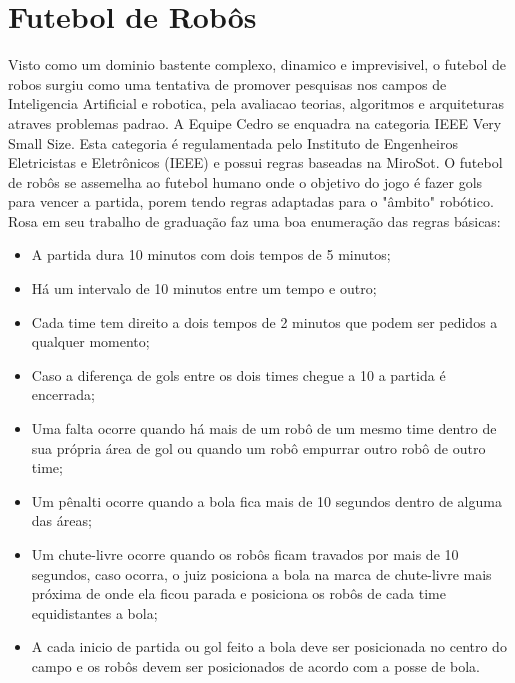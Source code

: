 \section{Futebol de Robôs}
 Visto como um dominio bastente complexo, dinamico e imprevisivel\cite{Costa:2000}, o futebol de robos surgiu como uma tentativa de promover pesquisas nos campos de Inteligencia Artificial e robotica, pela avaliacao teorias, algoritmos e arquiteturas atraves problemas padrao\cite{Kitano:1997}.
 A Equipe Cedro se enquadra na categoria IEEE Very Small Size. Esta categoria é regulamentada pelo Instituto de Engenheiros Eletricistas e Eletrônicos (IEEE) e possui regras baseadas na MiroSot\cite{Rosa:2015}. O futebol de robôs se assemelha ao futebol humano onde o objetivo do jogo é fazer gols para vencer a partida, porem tendo regras adaptadas para o "âmbito" robótico. 
 Rosa\cite{Rosa:2015} em seu trabalho de graduação faz uma boa enumeração das regras básicas:
 \begin{itemize}
 \item A partida dura 10 minutos com dois tempos de 5 minutos;
  \item Há um intervalo de 10 minutos entre um tempo e outro;
   \item Cada time tem direito a dois tempos de 2 minutos que podem ser pedidos a qualquer
   momento;
    \item Caso a diferença de gols entre os dois times chegue a 10 a partida é encerrada;
     \item Uma falta ocorre quando há mais de um robô de um mesmo time dentro de sua própria
     área de gol ou quando um robô empurrar outro robô de outro time;
     \item Um pênalti ocorre quando a bola fica mais de 10 segundos dentro de alguma das áreas;
     \item Um chute-livre ocorre quando os robôs ficam travados por mais de 10 segundos, caso
     ocorra, o juiz posiciona a bola na marca de chute-livre mais próxima de onde ela ficou
     parada e posiciona os robôs de cada time equidistantes a bola;
     \item A cada inicio de partida ou gol feito a bola deve ser posicionada no centro do campo e os
     robôs devem ser posicionados de acordo com a posse de bola.
 \end{itemize}

